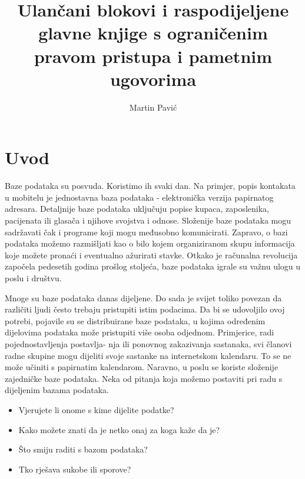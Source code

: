 \documentclass[times, utf8, diplomski]{fer}
\begin{document}

\title{Ulančani blokovi i raspodijeljene glavne knjige s ograničenim pravom pristupa i pametnim ugovorima}

\author{Martin Pavić}

\maketitle

\izvornik

\zahvala{}

\tableofcontents
\listoffigures

\chapter{Uvod}
Baze podataka su posvuda.  Koristimo ih svaki dan. Na primjer, popis kontakata u mobitelu je jednostavna baza podataka - elektronička verzija papirnatog adresara. Detaljnije baze podataka uključuju popise kupaca, zaposlenika, pacijenata ili glasača i njihove svojstva i odnose. Složenije baze podataka mogu sadržavati čak i programe koji mogu međusobno komunicirati. Zapravo, o bazi podataka možemo razmišljati kao o bilo kojem organiziranom skupu informacija koje možete pronaći i eventualno ažurirati stavke. Otkako je računalna revolucija započela pedesetih godina prošlog stoljeća, baze podataka igrale su važnu ulogu u poslu i društvu.

Mnoge su baze podataka danas dijeljene. Do sada je svijet toliko povezan da različiti ljudi često trebaju pristupiti istim podacima. Da bi se udovoljilo ovoj potrebi, pojavile su se distribuirane baze podataka, u kojima određenim dijelovima podataka može pristupiti više osoba odjednom. Primjerice, radi pojednostavljenja postavlja- nja ili ponovnog zakazivanja sastanaka, svi članovi radne skupine mogu dijeliti svoje sastanke na internetskom kalendaru. To se ne može učiniti s papirnatim kalendarom. Naravno, u poslu se koriste složenije zajedničke baze podataka. Neka od pitanja koja možemo postaviti pri radu s dijeljenim bazama podataka.

\begin{itemize}

\item Vjerujete li onome s kime dijelite podatke?

\item Kako možete znati da je netko onaj za koga kaže da je?

\item Što smiju raditi s bazom podataka?

\item Tko rješava sukobe ili sporove?

\end{itemize}
\end{document}
